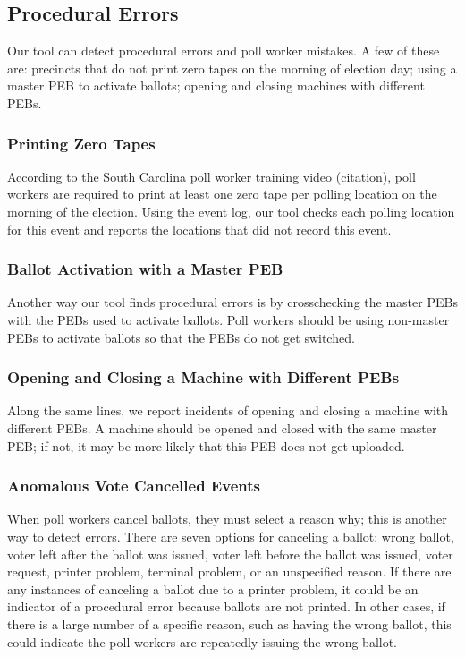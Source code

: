 \subsection{Procedural Errors}
Our tool can detect procedural errors and poll worker mistakes.  A few of these are: precincts that do not print zero tapes on the morning of election day; using a master PEB to activate ballots; opening and closing machines with different PEBs.  

\subsubsection{Printing Zero Tapes}
According to the South Carolina poll worker training video (citation), poll workers are required to print at least one zero tape per polling location on the morning of the election.  Using the event log, our tool checks each polling location for this event and reports the locations that did not record this event.  

\subsubsection{Ballot Activation with a Master PEB}
Another way our tool finds procedural errors is by crosschecking the master PEBs with the PEBs used to activate ballots.  Poll workers should be using non-master PEBs to activate ballots so that the PEBs do not get switched.  

\subsubsection{Opening and Closing a Machine with Different PEBs}
Along the same lines, we report incidents of opening and closing a machine with different PEBs.  A machine should be opened and closed with the same master PEB; if not, it may be more likely that this PEB does not get uploaded.   

\subsubsection{Anomalous Vote Cancelled Events}
When poll workers cancel ballots, they must select a reason why; this is another way to detect errors.  There are seven options for canceling a ballot: wrong ballot, voter left after the ballot was issued, voter left before the ballot was issued, voter request, printer problem, terminal problem, or an unspecified reason.  If there are any instances of canceling a ballot due to a printer problem, it could be an indicator of a procedural error because ballots are not printed.  In other cases, if there is a large number of a specific reason, such as having the wrong ballot, this could indicate the poll workers are repeatedly issuing the wrong ballot.  




